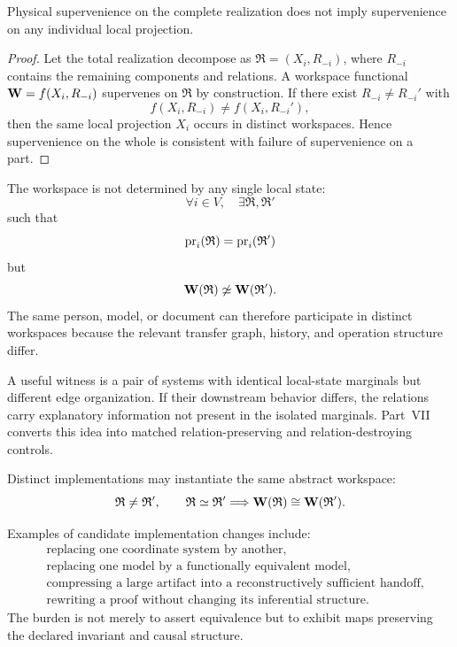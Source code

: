 \begin{proposition}\label{prop:supervenience-relational}
Physical supervenience on the complete realization does not imply
supervenience on any individual local projection.
\end{proposition}

\begin{proof}
Let the total realization decompose as \(\mathfrak R=(X_i,R_{-i})\), where
\(R_{-i}\) contains the remaining components and relations. A workspace
functional \(\mathbf W=f(X_i,R_{-i})\) supervenes on \(\mathfrak R\) by
construction. If there exist \(R_{-i}\neq R_{-i}'\) with
\[
f(X_i,R_{-i})\neq f(X_i,R_{-i}'),
\]
then the same local projection \(X_i\) occurs in distinct workspaces. Hence
supervenience on the whole is consistent with failure of supervenience on a
part.
\end{proof}


The workspace is not determined by any single local state:
\[
\forall i\in V,
\quad
\exists\mathfrak R,\mathfrak R'
\]
such that
\[
\operatorname{pr}_i(\mathfrak R)=\operatorname{pr}_i(\mathfrak R')
\]
but
\[
\mathbf W(\mathfrak R)\not\simeq\mathbf W(\mathfrak R').
\]
The same person, model, or document can therefore participate in distinct
workspaces because the relevant transfer graph, history, and operation
structure differ.

A useful witness is a pair of systems with identical local-state marginals but
different edge organization. If their downstream behavior differs, the
relations carry explanatory information not present in the isolated marginals.
Part~VII converts this idea into matched relation-preserving and
relation-destroying controls.


Distinct implementations may instantiate the same abstract workspace:
\[
\mathfrak R\neq\mathfrak R',
\qquad
\mathfrak R\simeq\mathfrak R'
\Longrightarrow
\mathbf W(\mathfrak R)\cong\mathbf W(\mathfrak R').
\]

Examples of candidate implementation changes include:
\[
\begin{aligned}
&\text{replacing one coordinate system by another},\\
&\text{replacing one model by a functionally equivalent model},\\
&\text{compressing a large artifact into a reconstructively sufficient handoff},\\
&\text{rewriting a proof without changing its inferential structure}.
\end{aligned}
\]
The burden is not merely to assert equivalence but to exhibit maps preserving
the declared invariant and causal structure.

